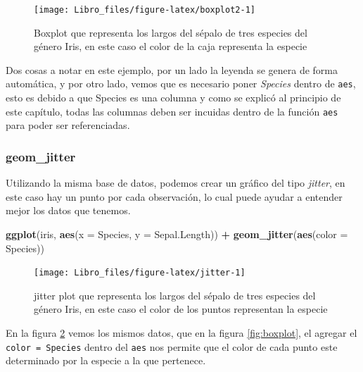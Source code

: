 \documentclass[]{book}
\newenvironment{Shaded}{\begin{snugshade}}{\end{snugshade}}
\newcommand{\DataTypeTok}[1]{\textcolor[rgb]{0.13,0.29,0.53}{#1}}
\newcommand{\KeywordTok}[1]{\textcolor[rgb]{0.13,0.29,0.53}{\textbf{#1}}}
\newcommand{\NormalTok}[1]{#1}
\newcommand{\OperatorTok}[1]{\textcolor[rgb]{0.81,0.36,0.00}{\textbf{#1}}}
\newcommand{\StringTok}[1]{\textcolor[rgb]{0.31,0.60,0.02}{#1}}
\begin{document}
\begin{figure}

{\centering \texttt{[image: Libro\_files/figure-latex/boxplot2-1]} 

}

\caption{Boxplot que representa los largos del sépalo de tres especies del género Iris, en este caso el color de la caja representa la especie}\label{fig:boxplot2}
\end{figure}

Dos cosas a notar en este ejemplo, por un lado la leyenda se genera de
forma automática, y por otro lado, vemos que es necesario poner
\emph{Species} dentro de \texttt{aes}, esto es debido a que Species es
una columna y como se explicó al principio de este capítulo, todas las
columnas deben ser incuidas dentro de la función \texttt{aes} para poder
ser referenciadas.

\hypertarget{geom_jitter}{%
\subsubsection{geom\_jitter}\label{geom_jitter}}

Utilizando la misma base de datos, podemos crear un gráfico del tipo
\emph{jitter}, en este caso hay un punto por cada observación, lo cual
puede ayudar a entender mejor los datos que tenemos.

\begin{Shaded}
\begin{Highlighting}[]
\KeywordTok{ggplot}\NormalTok{(iris, }\KeywordTok{aes}\NormalTok{(}\DataTypeTok{x =}\NormalTok{ Species, }\DataTypeTok{y =}\NormalTok{ Sepal.Length)) }\OperatorTok{+}\StringTok{ }\KeywordTok{geom_jitter}\NormalTok{(}\KeywordTok{aes}\NormalTok{(}\DataTypeTok{color =}\NormalTok{ Species))}
\end{Highlighting}
\end{Shaded}

\begin{figure}

{\centering \texttt{[image: Libro\_files/figure-latex/jitter-1]} 

}

\caption{jitter plot que representa los largos del sépalo de tres especies del género Iris, en este caso el color de los puntos representan la especie}\label{fig:jitter}
\end{figure}

En la figura \ref{fig:jitter} vemos los mismos datos, que en la figura
\ref{fig:boxplot}, el agregar el \texttt{color\ =\ Species} dentro del
\texttt{aes} nos permite que el color de cada punto este determinado por
la especie a la que pertenece.
\end{document}
